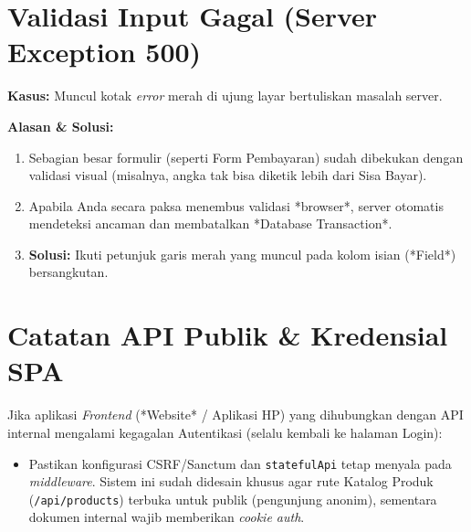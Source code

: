 \section{Validasi Input Gagal (Server Exception 500)}
\textbf{Kasus:} Muncul kotak \textit{error} merah di ujung layar bertuliskan masalah server.

\textbf{Alasan \& Solusi:}
\begin{enumerate}
    \item Sebagian besar formulir (seperti Form Pembayaran) sudah dibekukan dengan validasi visual (misalnya, angka tak bisa diketik lebih dari Sisa Bayar).
    \item Apabila Anda secara paksa menembus validasi *browser*, server otomatis mendeteksi ancaman dan membatalkan *Database Transaction*. 
    \item \textbf{Solusi:} Ikuti petunjuk garis merah yang muncul pada kolom isian (*Field*) bersangkutan.
\end{enumerate}

\section{Catatan API Publik \& Kredensial SPA}
Jika aplikasi \textit{Frontend} (*Website* / Aplikasi HP) yang dihubungkan dengan API internal mengalami kegagalan Autentikasi (selalu kembali ke halaman Login):
\begin{itemize}
    \item Pastikan konfigurasi CSRF/Sanctum dan \texttt{statefulApi} tetap menyala pada \textit{middleware}. Sistem ini sudah didesain khusus agar rute Katalog Produk (\texttt{/api/products}) terbuka untuk publik (pengunjung anonim), sementara dokumen internal wajib memberikan \textit{cookie auth}.
\end{itemize}
